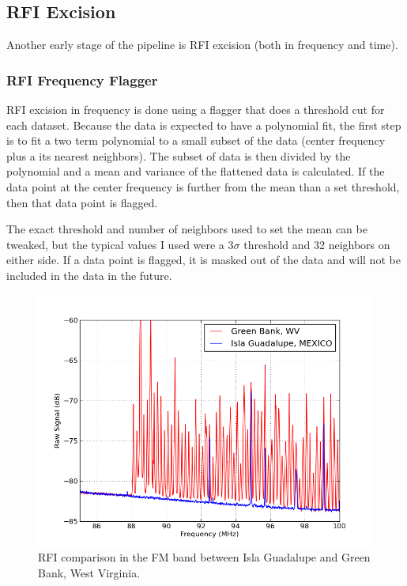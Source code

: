 \subsection{RFI Excision}
Another early stage of the pipeline is RFI excision (both in frequency and time). 

\subsubsection{RFI Frequency Flagger}
RFI excision in frequency is done using a flagger that does a threshold cut for each dataset. Because the data is expected to have a polynomial fit, the first step is to fit a two term polynomial to a small subset of the data (center frequency plus a its nearest neighbors). The subset of data is then divided by the polynomial and a mean and variance of the flattened data is calculated. If the data point at the center frequency is further from the mean than a set threshold, then that data point is flagged. 

The exact threshold and number of neighbors used to set the mean can be tweaked, but the typical values I used were a 3$\sigma$ threshold and 32 neighbors on either side. If a data point is flagged, it is masked out of the data and will not be included in the data in the future. 

\begin{figure}[htb]
\begin{center}
\includegraphics[width=0.9\linewidth]{Data_analysis/figures/FM_band_comp.png}
\caption{RFI comparison in the FM band between Isla Guadalupe and Green Bank, West Virginia. }
\label{Fig:FM_band}
\end{center}
\end{figure}

